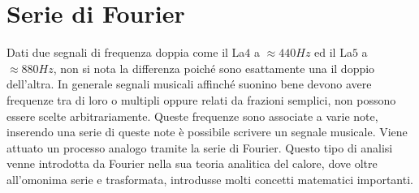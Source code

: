 \documentclass{article}
\numberwithin{equation}{subsection}
\begin{document}
\clearpage

\section{Serie di Fourier}

Dati due segnali di frequenza doppia come il La$4$ a $\approx 440Hz$ ed il La$5$ a $\approx 880Hz$, non si nota la differenza poiché sono esattamente una il doppio dell'altra. 
In generale segnali musicali affinché suonino bene devono avere frequenze tra di loro o multipli oppure relati da frazioni semplici, non possono essere scelte arbitrariamente. 
Queste frequenze sono associate a varie note, inserendo una serie di queste note è possibile scrivere un segnale musicale. Viene attuato un processo analogo tramite la serie di 
Fourier. Questo tipo di analisi venne introdotta da Fourier nella sua teoria analitica del calore, dove oltre all'omonima serie e trasformata, introdusse molti concetti 
matematici importanti. 
\end{document}
